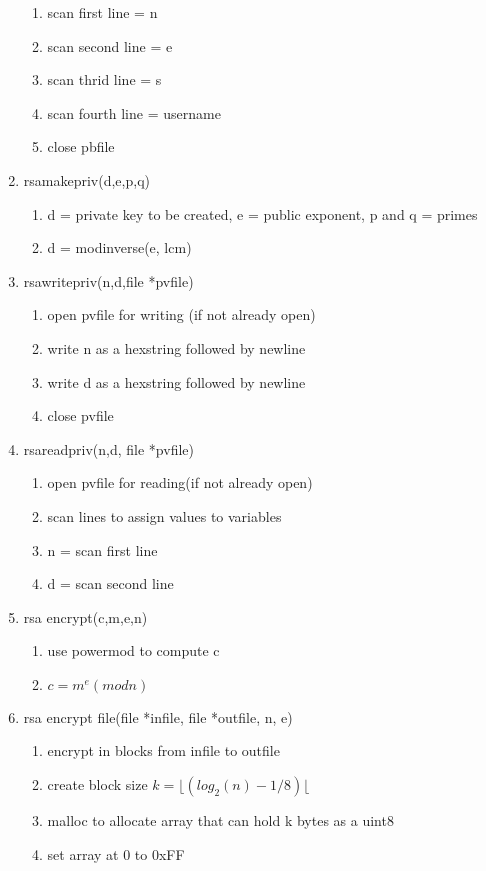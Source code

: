 \documentclass[11pt]{article}
\begin{document}
\begin{enumerate}
\begin{enumerate}
	\item scan first line = n
	\item scan second line = e
	\item scan thrid line = s
	\item scan fourth line = username
	\item close pbfile
	\end{enumerate}
\item rsamakepriv(d,e,p,q)
	\begin{enumerate}
	\item d = private key to be created, e = public exponent, p and q = primes
	\item d = modinverse(e, lcm)
	\end{enumerate}
\item rsawritepriv(n,d,file *pvfile)
	\begin{enumerate}
	\item open pvfile for writing (if not already open)
	\item write n as a hexstring followed by newline
	\item write d as a hexstring followed by newline
	\item close pvfile
	\end{enumerate}
\item rsareadpriv(n,d, file *pvfile)
	\begin{enumerate}
	\item open pvfile for reading(if not already open)
	\item scan lines to assign values to variables
	\item n = scan first line
	\item d = scan second line
	\end{enumerate}
\item rsa encrypt(c,m,e,n)
	\begin{enumerate}
	\item use powermod to compute c
	\item \(c = m^e (mod n)\)
	\end{enumerate}
\item rsa encrypt file(file *infile, file *outfile, n, e)
	\begin{enumerate}
	\item encrypt in blocks from infile to outfile
	\item create block size \(k = \lfloor (log_2 (n) -1 / 8) \lfloor\)
	\item malloc to allocate array that can hold k bytes as a uint8
	\item set array at 0 to 0xFF

\end{enumerate}
\end{enumerate}
\end{document}
